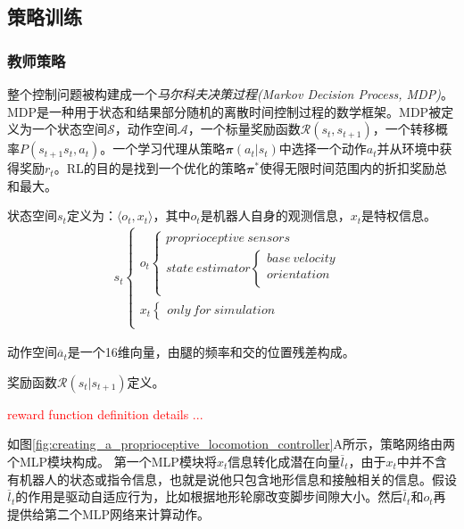 \subsection[策略训练]{策略训练}
\subsubsection[教师策略]{教师策略}
整个控制问题被构建成一个\emph{马尔科夫决策过程(Markov Decision Process, MDP)}。MDP是一种用于状态和结果部分随机的离散时间控制过程的数学框架。MDP被定义为一个状态空间$\mathcal{S}$，动作空间$\mathcal{A}$，一个标量奖励函数$\mathcal{R}(s_t,s_{t+1})$，一个转移概率$P(s_{t+1}s_t, a_t)$。一个学习代理从策略$\mathbfit{\pi}(a_t|s_t)$中选择一个动作$a_t$并从环境中获得奖励$r_t$。RL的目的是找到一个优化的策略$\mathbfit{\pi}^*$使得无限时间范围内的折扣奖励总和最大。

状态空间$s_t$定义为：$\langle o_t, x_t\rangle$，其中$o_t$是机器人自身的观测信息，$x_t$是特权信息。
\begin{align}
    s_t\begin{cases}
        o_t\begin{cases}
            proprioceptive\ sensors\\
            state\ estimator\begin{cases}
                base\ velocity\\
                orientation\\
            \end{cases}\\
        \end{cases}\\
        x_t\begin{cases}
            only\ for\ simulation
        \end{cases}\\
    \end{cases}
\end{align}

动作空间$\overline a_t$是一个16维向量，由腿的频率和交的位置残差构成。

奖励函数$\mathcal{R}(s_t|s_{t+1})$定义。

\textcolor{red}{reward function definition details ...}

如图\ref{fig:creating_a_proprioceptive_locomotion_controller}A所示，策略网络由两个MLP模块构成。
第一个MLP模块将$x_t$信息转化成潜在向量$\overline{l}_t$，由于$x_t$中并不含有机器人的状态或指令信息，也就是说他只包含地形信息和接触相关的信息。假设$\overline{l}_t$的作用是驱动自适应行为，比如根据地形轮廓改变脚步间隙大小。然后$\overline{l}_t$和$o_t$再提供给第二个MLP网络来计算动作。

